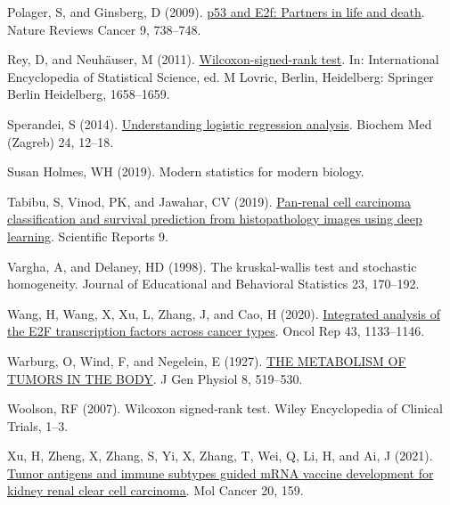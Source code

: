 \documentclass[
  parskip,
  oneside]{scrreprt}
\newlength{\cslhangindent}
\newlength{\cslentryspacingunit} %
\newenvironment{CSLReferences}[2] %
 {%
  \setlength{\parindent}{0pt}
  \ifodd #1
  \let\oldpar\par
  \def\par{\hangindent=\cslhangindent\oldpar}
  \fi
  \setlength{\parskip}{#2\cslentryspacingunit}
 }%
 {}
\begin{document}
\begin{CSLReferences}{0}{0}
\leavevmode{}%
Polager, S, and Ginsberg, D (2009).
\href{https://doi.org/10.1038/nrc2718}{p53 and E2f: Partners in life and
death}. Nature Reviews Cancer 9, 738--748.

\leavevmode{}%
Rey, D, and Neuhäuser, M (2011).
\href{https://doi.org/10.1007/978-3-642-04898-2_616}{Wilcoxon-signed-rank
test}. In: International Encyclopedia of Statistical Science, ed. M
Lovric, Berlin, Heidelberg: Springer Berlin Heidelberg, 1658--1659.

\leavevmode{}%
Sperandei, S (2014).
\href{https://doi.org/10.11613/BM.2014.003}{Understanding logistic
regression analysis}. Biochem Med (Zagreb) 24, 12--18.

\leavevmode{}%
Susan Holmes, WH (2019). Modern statistics for modern biology.

\leavevmode{}%
Tabibu, S, Vinod, PK, and Jawahar, CV (2019).
\href{https://doi.org/10.1038/s41598-019-46718-3}{Pan-renal cell
carcinoma classification and survival prediction from histopathology
images using deep learning}. Scientific Reports 9.

\leavevmode{}%
Vargha, A, and Delaney, HD (1998). The kruskal-wallis test and
stochastic homogeneity. Journal of Educational and Behavioral Statistics
23, 170--192.

\leavevmode{}%
Wang, H, Wang, X, Xu, L, Zhang, J, and Cao, H (2020).
\href{https://doi.org/10.3892/or.2020.7504}{Integrated analysis of the
E2F transcription factors across cancer types}. Oncol Rep 43,
1133--1146.

\leavevmode{}%
Warburg, O, Wind, F, and Negelein, E (1927).
\href{https://doi.org/10.1085/jgp.8.6.519}{THE METABOLISM OF TUMORS IN
THE BODY}. J Gen Physiol 8, 519--530.

\leavevmode{}%
Woolson, RF (2007). Wilcoxon signed‐rank test. Wiley Encyclopedia of
Clinical Trials, 1--3.

\leavevmode{}%
Xu, H, Zheng, X, Zhang, S, Yi, X, Zhang, T, Wei, Q, Li, H, and Ai, J
(2021). \href{https://doi.org/10.1186/s12943-021-01465-w}{Tumor antigens
and immune subtypes guided mRNA vaccine development for kidney renal
clear cell carcinoma}. Mol Cancer 20, 159.


\end{CSLReferences}
\end{document}
